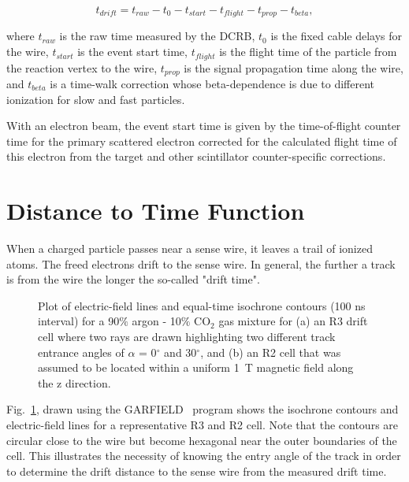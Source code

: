 \documentclass{article}
\begin{document}
\begin{equation} 
\label{drift}
t_{drift} = t_{raw} - t_{0} - t_{start} - t_{flight} - t_{prop} - t_{beta},
\end{equation}

\noindent
where $t_{raw}$ is the raw time measured by the DCRB, 
$t_0$ is the fixed cable delays for the wire, $t_{start}$ is the event 
start time, $t_{flight}$ is the 
flight time of the particle from the reaction vertex to the wire, $t_{prop}$ 
is the signal propagation time along the wire, and $t_{beta}$ is a time-walk 
correction whose beta-dependence is due to different ionization for slow 
and fast particles.  
 
With an electron beam, the event start time is 
given by the time-of-flight counter time for the primary scattered electron 
corrected for the calculated flight time of this electron from the target
and other scintillator counter-specific corrections.



\section{Distance to Time Function}
\label{funcpar} 
When a charged particle passes near a sense wire, it leaves a 
trail of ionized atoms.  The freed electrons drift to the sense wire.  In general,
the further a track is from the wire the longer the so-called "drift time".

\begin{figure}[htpb]
\vspace{7.5cm} 
\caption{\small{Plot of electric-field lines and equal-time isochrone contours
(100 ns interval) for a 90$\%$ argon - 10$\%$ CO$_2$ gas mixture for (a) an R3
drift cell where two rays are drawn highlighting two different track entrance 
angles of $\alpha$ = 0$^{\circ}$ and 30$^{\circ}$, and (b) an R2 cell that 
was assumed to be located within a uniform 1~T magnetic field along the z 
direction.}}
\label{garfield}
\end{figure}

Fig.~\ref{garfield}, drawn using the GARFIELD~\cite{garfield} program 
shows the isochrone contours and electric-field lines for 
a representative R3 and R2 cell.  Note that the contours are circular close 
to the wire but become hexagonal near the outer boundaries of the cell.  This 
illustrates the necessity of knowing the entry angle of the track in order to 
determine the drift distance to the sense wire from the measured drift time.
\end{document}
